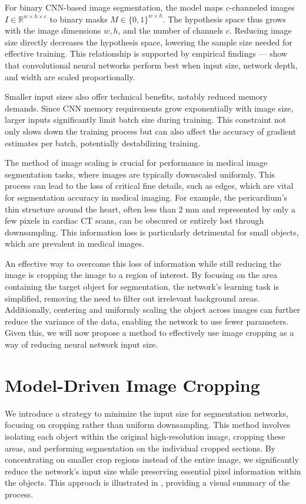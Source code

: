 For binary CNN-based image segmentation, the model maps \(c\)-channeled images \(I \in \mathbb{R}^{w \times h \times c}\) to binary masks \(M \in \{0, 1\}^{w \times h}\). The hypothesis space thus grows with the image dimensions \(w, h\), and the number of channels \(c\). Reducing image size directly decreases the hypothesis space, lowering the sample size needed for effective training. This relationship is supported by empirical findings --- \citet{tanEfficientNetRethinkingModel2020} show that convolutional neural networks perform best when input size, network depth, and width are scaled proportionally.

Smaller input sizes also offer technical benefits, notably reduced memory demands. Since CNN memory requirements grow exponentially with image size, larger inputs significantly limit batch size during training. This constraint not only slows down the training process but can also affect the accuracy of gradient estimates per batch, potentially destabilizing training.

The method of image scaling is crucial for performance in medical image segmentation tasks, where images are typically downscaled uniformly. This process can lead to the loss of critical fine details, such as edges, which are vital for segmentation accuracy in medical imaging. For example, the pericardium's thin structure around the heart, often less than 2 mm and represented by only a few pixels in cardiac CT scans, can be obscured or entirely lost through downsampling. This information loss is particularly detrimental for small objects, which are prevalent in medical images.

An effective way to overcome this loss of information while still reducing the image is cropping the image to a region of interest. By focusing on the area containing the target object for segmentation, the network's learning task is simplified, removing the need to filter out irrelevant background areas. Additionally, centering and uniformly scaling the object across images can further reduce the variance of the data, enabling the network to use fewer parameters. Given this, we will now propose a method to effectively use image cropping as a way of reducing neural network input size.

\section{Model-Driven Image Cropping}

We introduce a strategy to minimize the input size for segmentation networks, focusing on cropping rather than uniform downsampling. This method involves isolating each object within the original high-resolution image, cropping these areas, and performing segmentation on the individual cropped sections. By concentrating on smaller crop regions instead of the entire image, we significantly reduce the network's input size while preserving essential pixel information within the objects. This approach is illustrated in , providing a visual summary of the process.

